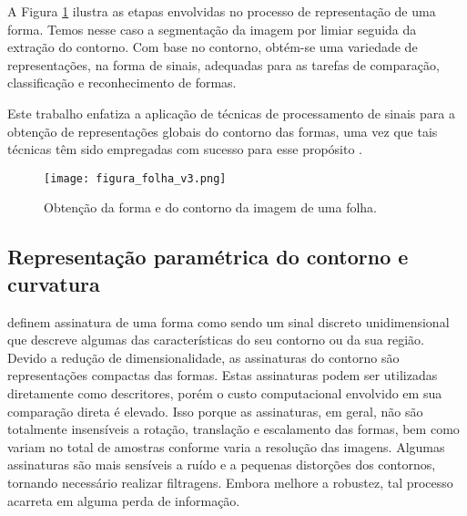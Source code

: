 A Figura \ref{fig:folha_contorno1} ilustra as etapas envolvidas no processo de representação de uma forma. Temos nesse caso a segmentação da imagem por limiar seguida da extração do contorno. Com base no contorno, obtém-se uma variedade de representações, na forma de sinais, adequadas para as tarefas de comparação, classificação e reconhecimento de formas.

Este trabalho enfatiza a aplicação de técnicas de processamento de sinais para a obtenção de representações globais do contorno das formas, uma vez que tais técnicas têm sido empregadas com sucesso para esse propósito \cite{Costa:2009}. 

\begin{comment}
Técnicas baseadas em contorno de formas exploram apenas a região da borda da forma. Há dois tipos de abordagens para extração de características do contorno das formas: global e estrutural. Na abordagem global a forma não é dividida em subpartes e um vetor de características que representa toda a borda é obtido para representar a forma. Na abordagem estrutural a borda da forma é particionada em segmentos, denominados de primitivas mediante algum critério. A representação final é geralmente uma cadeia de caracteres, um grafo ou uma árvore.
\end{comment}



    

\begin{figure} 
\caption{\label{fig:folha_contorno1} Obtenção da forma e do contorno da imagem de uma folha.}
\texttt{[image: figura\_folha\_v3.png]}
\end{figure}

\subsection{\label{sec:Assinatura}Representação paramétrica do contorno e curvatura
}

 definem assinatura de uma forma como sendo um sinal discreto unidimensional que descreve algumas das características do seu contorno ou da sua região. Devido a redução de dimensionalidade, as assinaturas do contorno são representações compactas das formas. Estas assinaturas podem ser utilizadas diretamente como descritores, porém o custo computacional envolvido em sua comparação direta é elevado. Isso porque as assinaturas, em geral, não são totalmente insensíveis a rotação, translação e escalamento das formas, bem como variam no total de amostras conforme varia a resolução das imagens. Algumas assinaturas são mais sensíveis a ruído e a pequenas distorções dos contornos, tornando necessário realizar filtragens. Embora melhore a robustez, tal processo acarreta em alguma perda de informação.

